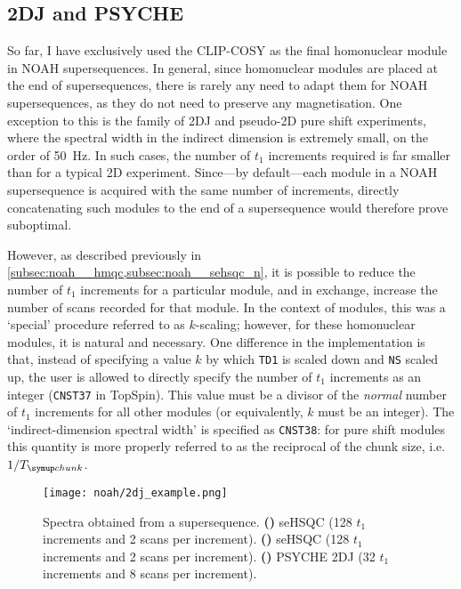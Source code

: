 \subsection{2DJ and PSYCHE}
\label{subsec:noah__2djpsyche}

So far, I have exclusively used the CLIP-COSY as the final homonuclear module in NOAH supersequences.
In general, since homonuclear modules are placed at the end of supersequences, there is rarely any need to adapt them for NOAH supersequences, as they do not need to preserve any magnetisation.
One exception to this is the family of 2DJ and pseudo-2D pure shift experiments, where the spectral width in the indirect dimension is extremely small, on the order of \qty{50}{\Hz}.
In such cases, the number of $t_1$ increments required is far smaller than for a typical 2D experiment.
Since---by default---each module in a NOAH supersequence is acquired with the same number of increments, directly concatenating such modules to the end of a supersequence would therefore prove suboptimal.

However, as described previously in \cref{subsec:noah__hmqc,subsec:noah__sehsqc_n}, it is possible to reduce the number of $t_1$ increments for a particular module, and in exchange, increase the number of scans recorded for that module.
In the context of \nitrogen{} modules, this was a `special' procedure referred to as $k$-scaling; however, for these homonuclear modules, it is natural and necessary.
One difference in the implementation is that, instead of specifying a value $k$ by which \texttt{TD1} is scaled down and \texttt{NS} scaled up, the user is allowed to directly specify the number of $t_1$ increments as an integer (\texttt{CNST37} in TopSpin).
This value must be a divisor of the \textit{normal} number of $t_1$ increments for all other modules (or equivalently, $k$ must be an integer).
The `indirect-dimension spectral width' is specified as \texttt{CNST38}: for pure shift modules this quantity is more properly referred to as the reciprocal of the chunk size, i.e.\ $1/\Tchunk$.

\begin{figure}[!ht]
    \centering
    \texttt{[image: noah/2dj\_example.png]}%
    {\label{fig:2dj_example_spn}}%
    {\label{fig:2dj_example_spc}}%
    {\label{fig:2dj_example_j}}%
    \caption[Spectra from a  supersequence]{
        Spectra obtained from a  supersequence.
        \textbf{()} \nitrogen{} seHSQC (128 $t_1$ increments and 2 scans per increment).
        \textbf{()} \carbon{} seHSQC (128 $t_1$ increments and 2 scans per increment).
        \textbf{()} PSYCHE 2DJ (32 $t_1$ increments and 8 scans per increment).
    }
    \label{fig:2dj_example}
\end{figure}

